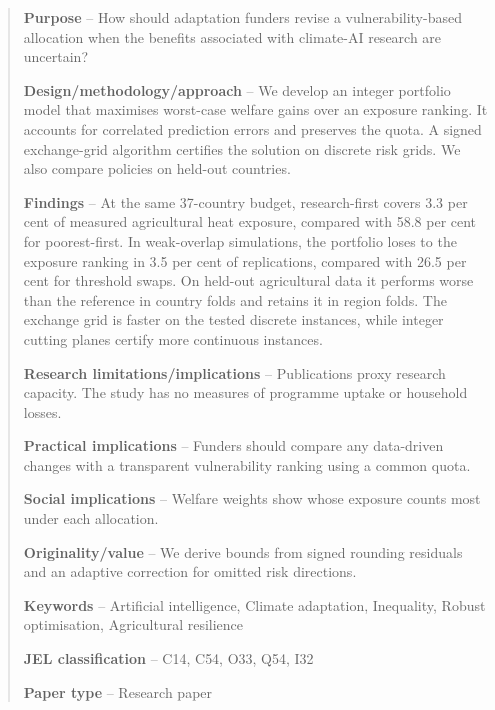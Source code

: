 \begin{abstract}
\noindent\textbf{Purpose} -- How should adaptation funders revise a vulnerability-based
allocation when the benefits associated with climate-AI research are uncertain?

\smallskip\noindent\textbf{Design/methodology/approach} -- We develop an integer portfolio model
that maximises worst-case welfare gains over an exposure ranking. It accounts for correlated
prediction errors and preserves the quota. A signed exchange-grid algorithm certifies
the solution on discrete risk grids. We also compare policies on held-out countries.

\smallskip\noindent\textbf{Findings} -- At the same 37-country budget, research-first covers
3.3 per cent of measured agricultural heat exposure, compared with 58.8 per cent for
poorest-first. In weak-overlap simulations, the portfolio loses to the exposure ranking in
3.5 per cent of replications, compared with 26.5 per cent for threshold swaps. On held-out
agricultural data it performs worse than the reference in country folds and retains it in
region folds. The exchange grid is faster on the tested discrete instances, while
integer cutting planes certify more continuous instances.

\smallskip\noindent\textbf{Research limitations/implications} -- Publications proxy research
capacity. The study has no measures of programme uptake or household losses.

\smallskip\noindent\textbf{Practical implications} -- Funders should compare any data-driven
changes with a transparent vulnerability ranking using a common quota.

\smallskip\noindent\textbf{Social implications} -- Welfare weights show whose exposure counts
most under each allocation.

\smallskip\noindent\textbf{Originality/value} -- We derive bounds from signed rounding residuals and
an adaptive correction for omitted risk directions.

\smallskip\noindent\textbf{Keywords} -- Artificial intelligence, Climate adaptation, Inequality,
Robust optimisation, Agricultural resilience

\smallskip\noindent\textbf{JEL classification} -- C14, C54, O33, Q54, I32

\smallskip\noindent\textbf{Paper type} -- Research paper
\end{abstract}
